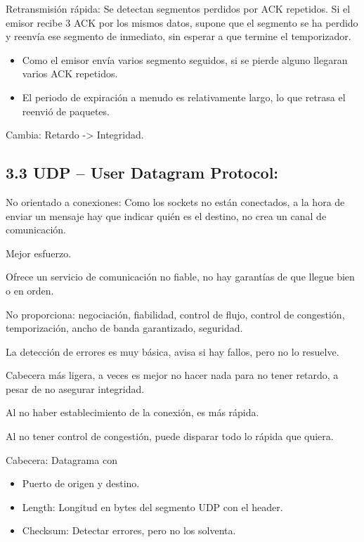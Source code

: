 \documentclass[12pt, twoside, openright]{report} %
\begin{document}
Retransmisión rápida: Se detectan segmentos perdidos por ACK
repetidos. Si el emisor recibe 3 ACK por los mismos datos, supone
que el segmento se ha perdido y reenvía ese segmento de inmediato,
sin esperar a que termine el temporizador.

\begin{itemize}
	\item Como el emisor envía varios segmento seguidos, si se pierde alguno
	      llegaran varios ACK repetidos.
	\item El periodo de expiración a menudo es relativamente largo, lo que
	      retrasa el reenvió de paquetes.
\end{itemize}

Cambia: Retardo -\textgreater{} Integridad.
\pagebreak

\subsection{3.3 UDP -- User Datagram Protocol:}


No orientado a conexiones: Como los sockets no están conectados, a
la hora de enviar un mensaje hay que indicar quién es el destino, no
crea un canal de comunicación.

Mejor esfuerzo.

Ofrece un servicio de comunicación no fiable, no hay garantías de
que llegue bien o en orden.

No proporciona: negociación, fiabilidad, control de flujo, control
de congestión, temporización, ancho de banda garantizado, seguridad.

La detección de errores es muy básica, avisa si hay fallos, pero no
lo resuelve.

Cabecera más ligera, a veces es mejor no hacer nada para no tener
retardo, a pesar de no asegurar integridad.

Al no haber establecimiento de la conexión, es más rápida.

Al no tener control de congestión, puede disparar todo lo rápida que
quiera.

Cabecera: Datagrama con

\begin{itemize}
	\item Puerto de origen y destino.
	\item Length: Longitud en bytes del segmento UDP con el header.
	\item Checksum: Detectar errores, pero no los solventa.
	      \begin{figure}[H]
		      {\def\svgwidth{.5\textwidth}
			      }
	      \end{figure}
\end{itemize}
\end{document}
